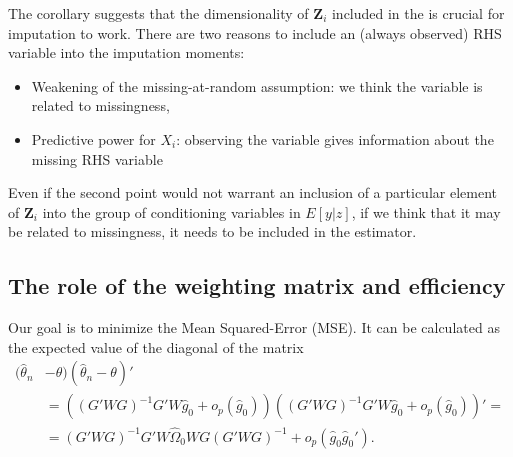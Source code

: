 \documentclass{article}
\theoremstyle{definition}
\theoremstyle{remark}
\begin{document}
The corollary suggests that the dimensionality of $\mathbf{Z}_i$ included in the is crucial for imputation to work. There are two reasons to include an (always observed) RHS variable into the imputation moments:
\begin{itemize}
	\item Weakening of the missing-at-random assumption: we think the variable is related to missingness,
	\item Predictive power for $X_i$: observing the variable gives information about the missing RHS variable
\end{itemize}
Even if the second point would not warrant an inclusion of a particular element of $\mathbf{Z}_i$ into the group of conditioning variables in $E[y|z]$, if we think that it may be related to missingness, it needs to be included in the estimator. 

\subsection{The role of the weighting matrix and efficiency}
Our goal is to minimize the Mean Squared-Error (MSE). It can be calculated as the expected value of the diagonal of the matrix
\begin{align}
(\hat{\theta}_n &-\theta)(\hat{\theta}_n -\theta)' \\
&=((G'WG)^{-1}G'W \hat{g}_0 + o_p(\hat{g}_0))((G'WG)^{-1}G'W \hat{g}_0 + o_p(\hat{g}_0))'= \nonumber \\
&= (G'WG)^{-1} G'W \hat{\Omega}_0 W G (G'WG)^{-1}  + o_p(\hat{g}_0\hat{g}_0'). \nonumber
\end{align}
\end{document}
